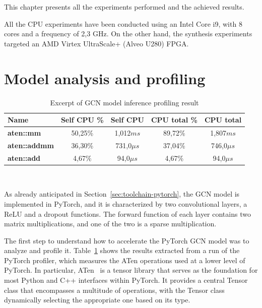 This chapter presents all the experiments performed and the achieved results.

All the CPU experiments have been conducted using an Intel Core i9, with 8 cores and a frequency of 2,3 GHz.
On the other hand, the synthesis experiments targeted an AMD Virtex UltraScale+ (Alveo U280) FPGA\@.

\section{Model analysis and profiling}
\label{sec:model-analysis}%

\begin{table}[b]
\centering
    \begin{tabular}{|p{6em} c c c c|}
    \hline
    \textbf{Name} & \textbf{Self CPU \%} & \textbf{Self CPU} & \textbf{CPU total \%} & \textbf{CPU total} \T\B \\
    \hline \hline
    \textbf{aten::mm} & 50,25\% & 1,012$ms$ & 89,72\% & 1,807$ms$ \T\B\\
    \hline
    \textbf{aten::addmm} & 36,30\% & 731,0$\mu s$ & 37,04\% & 746,0$\mu s$ \T\B\\
    \hline
    \textbf{aten::add} & 4,67\% & 94,0$\mu s$ & 4,67\% & 94,0$\mu s$ \T\B\\
    \hline
    \end{tabular}
    \\[10pt]
    \caption{Excerpt of GCN model inference profiling result}
    \label{tab:gcn_profiling}
\end{table}

As already anticipated in Section~\ref{sec:toolchain-pytorch}, the GCN model is implemented in PyTorch, and it is characterized by two convolutional layers, a ReLU and a dropout functions.
The forward function of each layer contains two matrix multiplications, and one of the two is a sparse multiplication.

The first step to understand how to accelerate the PyTorch GCN model was to analyze and profile it.
Table~\ref{tab:gcn_profiling} shows the results extracted from a run of the PyTorch profiler, which measures the ATen operations used at a lower level of PyTorch.
In particular, ATen~\cite{aten} is a tensor library that serves as the foundation for most Python and C++ interfaces within PyTorch.
It provides a central Tensor class that encompasses a multitude of operations, with the Tensor class dynamically selecting the appropriate one based on its type.

